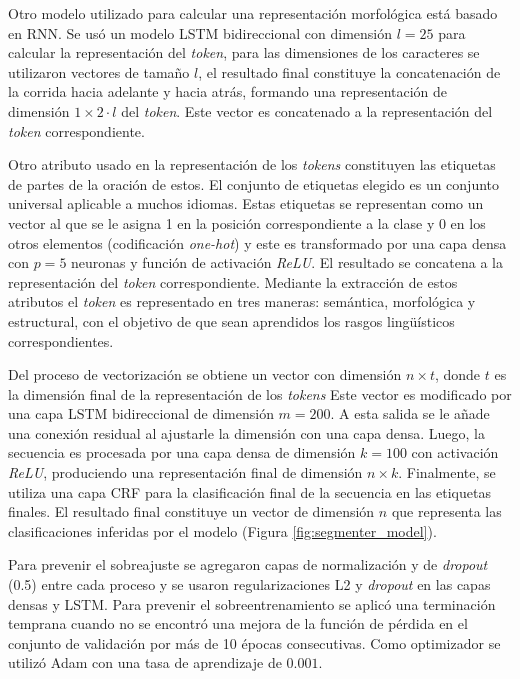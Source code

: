 \documentclass{rcci} %
\begin{document}
Otro modelo utilizado para calcular una representaci\'on morfol\'ogica est\'a basado en RNN. Se us\'o
un modelo LSTM bidireccional con dimensi\'on $l=25$ para calcular la representaci\'on del \textit{token}, para las dimensiones de los caracteres se
utilizaron vectores de tama\~no $l$, el resultado final constituye la concatenaci\'on de la corrida hacia adelante y
hacia atr\'as, formando una representaci\'on de dimensi\'on $1 \times 2 \cdot l$ del \textit{token}. Este vector es concatenado a la representaci\'on
del \textit{token} correspondiente. 

Otro atributo usado en la representaci\'on de los \textit{tokens} constituyen las etiquetas de 
partes de la oraci\'on de estos.
El conjunto de etiquetas elegido es un conjunto universal \cite{petrov2011universal} aplicable a muchos idiomas.
Estas etiquetas se representan como un vector al que se le asigna 1 en la posici\'on correspondiente a la clase y 0 en 
los otros elementos (codificaci\'on \textit{one-hot}) y este es transformado por una capa densa con $p=5$ neuronas
y funci\'on de activaci\'on \textit{ReLU}. El resultado se concatena a la representaci\'on del \textit{token} correspondiente. Mediante 
la extracci\'on de estos atributos el \textit{token} es representado en tres maneras: sem\'antica, morfol\'ogica y estructural, con el 
objetivo de que sean aprendidos los rasgos ling\"u\'isticos correspondientes.

Del proceso de vectorizaci\'on se obtiene un vector con dimensi\'on $n \times t$, donde $t$ es la dimensi\'on final de la representaci\'on
de los \textit{tokens}  Este vector es modificado por una capa LSTM bidireccional de dimensi\'on $m=200$. A esta salida se le 
a\~nade una conexi\'on residual al ajustarle la dimensi\'on con una capa densa. Luego, la secuencia es procesada por una 
capa densa de dimensi\'on $k=100$ con activaci\'on \textit{ReLU}, produciendo una representaci\'on final de dimensi\'on 
$n \times k$. Finalmente, se utiliza una capa CRF
para la clasificaci\'on final de la secuencia en las etiquetas finales. El resultado final constituye un vector
de dimensi\'on $n$ que representa las clasificaciones inferidas por el modelo (Figura \ref{fig:segmenter_model}).

Para prevenir el sobreajuste se agregaron capas de normalizaci\'on y de \textit{dropout} (0.5) entre cada proceso y se usaron regularizaciones
L2 y \textit{dropout} en las capas densas y LSTM. 
Para prevenir el sobreentrenamiento se aplic\'o una 
terminaci\'on temprana cuando no se encontr\'o una mejora de la funci\'on de p\'erdida en el conjunto de validaci\'on
por m\'as de 10 \'epocas consecutivas. Como optimizador se utiliz\'o Adam con una tasa de aprendizaje de $0.001$.
\end{document}
